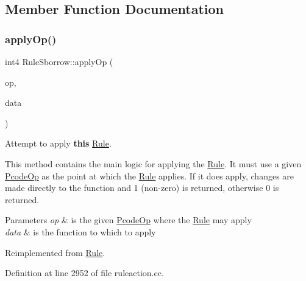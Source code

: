 \subsection{Member Function Documentation}
\mbox{\label{class_rule_sborrow_a624c5e919a23a5fd208c810aef997c48}} 
\subsubsection{\texorpdfstring{applyOp()}{applyOp()}}
{\footnotesize\ttfamily int4 Rule\+Sborrow\+::apply\+Op (\begin{DoxyParamCaption}\item[{\mbox{\hyperlink{class_pcode_op}{Pcode\+Op}} $\ast$}]{op,  }\item[{\mbox{\hyperlink{class_funcdata}{Funcdata}} \&}]{data }\end{DoxyParamCaption})\hspace{0.3cm}{\ttfamily [virtual]}}



Attempt to apply {\bfseries{this}} \mbox{\hyperlink{class_rule}{Rule}}. 

This method contains the main logic for applying the \mbox{\hyperlink{class_rule}{Rule}}. It must use a given \mbox{\hyperlink{class_pcode_op}{Pcode\+Op}} as the point at which the \mbox{\hyperlink{class_rule}{Rule}} applies. If it does apply, changes are made directly to the function and 1 (non-\/zero) is returned, otherwise 0 is returned. 
\begin{DoxyParams}{Parameters}
{\em op} & is the given \mbox{\hyperlink{class_pcode_op}{Pcode\+Op}} where the \mbox{\hyperlink{class_rule}{Rule}} may apply \\
\hline
{\em data} & is the function to which to apply \\
\hline
\end{DoxyParams}


Reimplemented from \mbox{\hyperlink{class_rule_a4e3e61f066670175009f60fb9dc60848}{Rule}}.



Definition at line 2952 of file ruleaction.\+cc.

